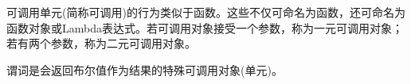 可调用单元(简称可调用)的行为类似于函数。这些不仅可命名为函数，还可命名为函数对象或Lambda表达式。若可调用对象接受一个参数，称为一元可调用对象；若有两个参数，称为二元可调用对象。

谓词是会返回布尔值作为结果的特殊可调用对象(单元)。
